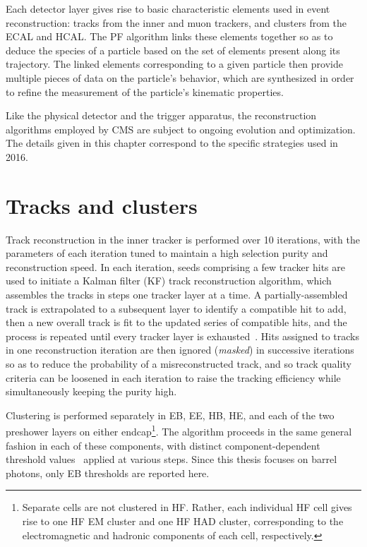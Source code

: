 Each detector layer gives rise to basic characteristic elements used in event reconstruction:
tracks from the inner and muon trackers, and clusters from the ECAL and HCAL. The PF algorithm links these elements together
so as to deduce the species of a particle based on the set of elements present along its trajectory. The linked elements
corresponding to a given particle then provide multiple pieces of data on the particle's behavior, which are synthesized
in order to refine the measurement of the particle's kinematic properties.

Like the physical detector and the trigger apparatus, the reconstruction algorithms employed by CMS are subject to ongoing evolution
and optimization. The details given in this chapter correspond to the specific strategies used in 2016.

\section{Tracks and clusters}
Track reconstruction in the inner tracker is performed over 10 iterations, with the parameters of each iteration tuned to maintain a high selection purity
and reconstruction speed. In each iteration, seeds comprising a few tracker hits are used to initiate a Kalman filter (KF) track reconstruction algorithm, which assembles
the tracks in steps one tracker layer at a time.
A partially-assembled track is extrapolated to a subsequent layer to identify a compatible hit to add, then a new overall track is fit to the updated series
of compatible hits, and the process is repeated until every tracker layer is exhausted~\cite{ref:cms_tdr_vol1}.
Hits assigned to tracks in one reconstruction iteration are then ignored (\textit{masked}) in successive iterations so as to reduce the probability of a misreconstructed track,
and so track quality criteria can be loosened in each iteration to raise the tracking efficiency while simultaneously keeping the purity high.

Clustering is performed separately in EB, EE, HB, HE, and each of the two preshower layers on either endcap\footnote{Separate cells are not clustered in HF.
Rather, each individual HF cell gives rise to one HF EM cluster and one HF HAD cluster, corresponding
to the electromagnetic and hadronic components of each cell, respectively.}. The algorithm proceeds in the same general
fashion in each of these components, with distinct component-dependent threshold values~\cite{ref:1748-0221/12/10/P10003} applied at various steps.
Since this thesis focuses on barrel photons, only EB thresholds are reported here.

